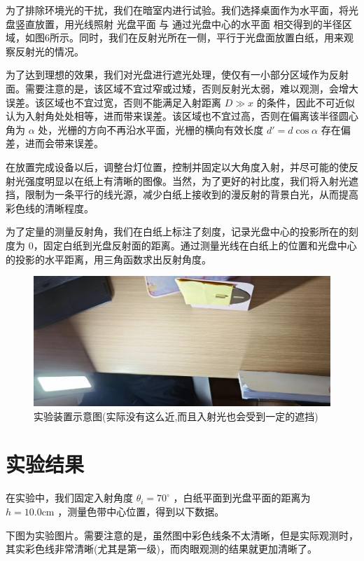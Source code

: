 \documentclass[fontset=windows]{article}
\begin{document}
为了排除环境光的干扰，我们在暗室内进行试验。我们选择桌面作为水平面，将光盘竖直放置，用光线照射  光盘平面  与  通过光盘中心的水平面  相交得到的半径区域，如图6所示。同时，我们在反射光所在一侧，平行于光盘面放置白纸，用来观察反射光的情况。

为了达到理想的效果，我们对光盘进行遮光处理，使仅有一小部分区域作为反射面。需要注意的是，该区域不宜过窄或过矮，否则反射光太弱，难以观测，会增大误差。该区域也不宜过宽，否则不能满足入射距离 $D \gg x$ 的条件，因此不可近似认为入射角处处相等，进而带来误差。该区域也不宜过高，否则在偏离该半径圆心角为 $\alpha$ 处，光栅的方向不再沿水平面，光栅的横向有效长度 $d' = d\cos \alpha$ 存在偏差，进而会带来误差。

在放置完成设备以后，调整台灯位置，控制并固定以大角度入射，并尽可能的使反射光强度明显以在纸上有清晰的图像。当然，为了更好的衬比度，我们将入射光遮挡，限制为一条平行的线光源，减少白纸上接收到的漫反射的背景白光，从而提高彩色线的清晰程度。

为了定量的测量反射角，我们在白纸上标注了刻度，记录光盘中心的投影所在的刻度为 0，固定白纸到光盘反射面的距离。通过测量光线在白纸上的位置和光盘中心的投影的水平距离，用三角函数求出反射角度。

\begin{figure}[htbp]
	\centering
	\includegraphics[scale=0.1]{4.jpg}
	\caption{ 实验装置示意图(实际没有这么近,而且入射光也会受到一定的遮挡) }
	\label{9}
\end{figure}

\newpage

\section{实验结果}

在实验中，我们固定入射角度 $\theta_i = 70^\circ$ ，白纸平面到光盘平面的距离为 $h = 10.0\mathrm{cm}$ ，测量色带中心位置，得到以下数据。

下图为实验图片。需要注意的是，虽然图中彩色线条不太清晰，但是实际观测时，其实彩色线非常清晰(尤其是第一级)，而肉眼观测的结果就更加清晰了。
\end{document}

